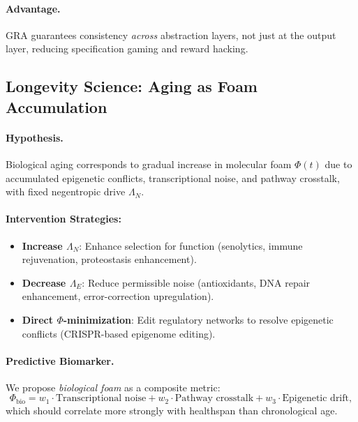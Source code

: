 \documentclass[11pt,a4paper]{article}
\theoremstyle{plain}
\theoremstyle{definition}
\theoremstyle{remark}
\newcommand{\Foam}{\Phi}
\begin{document}
\paragraph{Advantage.} GRA guarantees consistency \textit{across} abstraction layers, not just at the output layer, reducing specification gaming and reward hacking.

\subsection{Longevity Science: Aging as Foam Accumulation}

\paragraph{Hypothesis.} Biological aging corresponds to gradual increase in molecular foam $\Foam(t)$ due to accumulated epigenetic conflicts, transcriptional noise, and pathway crosstalk, with fixed negentropic drive $\Lambda_N$.

\paragraph{Intervention Strategies:}
\begin{itemize}
    \item \textbf{Increase $\Lambda_N$}: Enhance selection for function (senolytics, immune rejuvenation, proteostasis enhancement).
    \item \textbf{Decrease $\Lambda_E$}: Reduce permissible noise (antioxidants, DNA repair enhancement, error-correction upregulation).
    \item \textbf{Direct $\Foam$-minimization}: Edit regulatory networks to resolve epigenetic conflicts (CRISPR-based epigenome editing).
\end{itemize}

\paragraph{Predictive Biomarker.} We propose \textit{biological foam} as a composite metric:
\begin{equation}
\Foam_{\text{bio}} = w_1 \cdot \text{Transcriptional noise} + w_2 \cdot \text{Pathway crosstalk} + w_3 \cdot \text{Epigenetic drift},
\label{eq:bio_foam}
\end{equation}
which should correlate more strongly with healthspan than chronological age.

\end{document}

